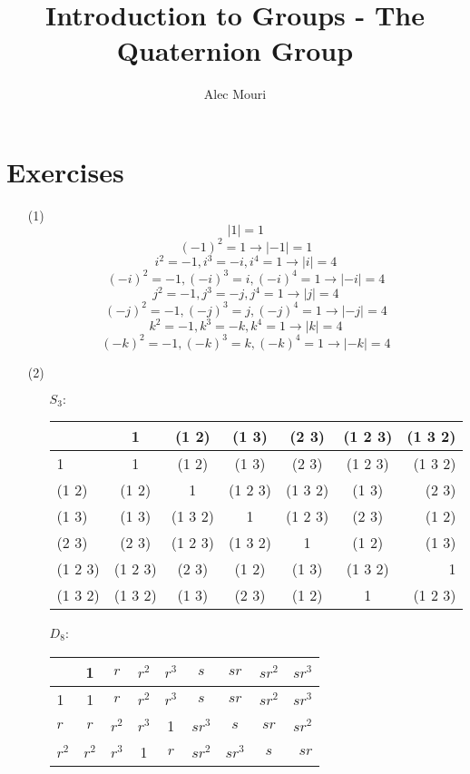 \documentclass[12pt]{article}
\begin{document}
\title{Introduction to Groups - The Quaternion Group}
\author{Alec Mouri}

\maketitle
\section*{Exercises}
\begin{itemize}
\item[(1)]
$$|1| = 1$$
$$(-1)^2 = 1 \rightarrow |-1| = 1$$
$$i^2 = -1, i^3 = -i, i^4 = 1 \rightarrow |i| = 4$$
$$(-i)^2 = -1, (-i)^3 = i, (-i)^4 = 1 \rightarrow |-i| = 4$$
$$j^2 = -1, j^3 = -j, j^4 = 1 \rightarrow |j| = 4$$
$$(-j)^2 = -1, (-j)^3 = j, (-j)^4 = 1 \rightarrow |-j| = 4$$
$$k^2 = -1, k^3 = -k, k^4 = 1 \rightarrow |k| = 4$$
$$(-k)^2 = -1, (-k)^3 = k, (-k)^4 = 1 \rightarrow |-k| = 4$$
\item[(2)]
\begin{itemize}
\item[$S_3:$]
\begin{tabular}{| l || c | c | c | c | c | r |}
\hline
& 1 & (1 2) & (1 3) & (2 3) & (1 2 3) & (1 3 2) \\
\hline
\hline
1 & 1 & (1 2) & (1 3) & (2 3) & (1 2 3) & (1 3 2) \\
\hline
(1 2) & (1 2) & 1 & (1 2 3) & (1 3 2) & (1 3) & (2 3) \\
\hline
(1 3) & (1 3) & (1 3 2) & 1 & (1 2 3) & (2 3) & (1 2) \\
\hline
(2 3) & (2 3) & (1 2 3) & (1 3 2) & 1 & (1 2) & (1 3) \\
\hline
(1 2 3) & (1 2 3) & (2 3) & (1 2) & (1 3) & (1 3 2) & 1 \\
\hline
(1 3 2) & (1 3 2) & (1 3) & (2 3) & (1 2) & 1 & (1 2 3) \\
\hline
\end{tabular}
\item[$D_8$:]
\begin{tabular}{| l || c | c | c | c | c | c | c | r |}
\hline
& 1 & $r$ & $r^2$ & $r^3$ & $s$ & $sr$ & $sr^2$ & $sr^3$ \\
\hline
\hline
1 & 1 & $r$ & $r^2$ & $r^3$ & $s$ & $sr$ & $sr^2$ & $sr^3$ \\
\hline
$r$ & $r$ & $r^2$ & $r^3$ & 1 & $sr^3$ & $s$ & $sr$ & $sr^2$ \\
\hline
$r^2$ & $r^2$ & $r^3$ & 1 & $r$ & $sr^2$ & $sr^3$ & $s$ & $sr$ \\
\hline

\end{tabular}
\end{itemize}
\end{itemize}
\end{document}
